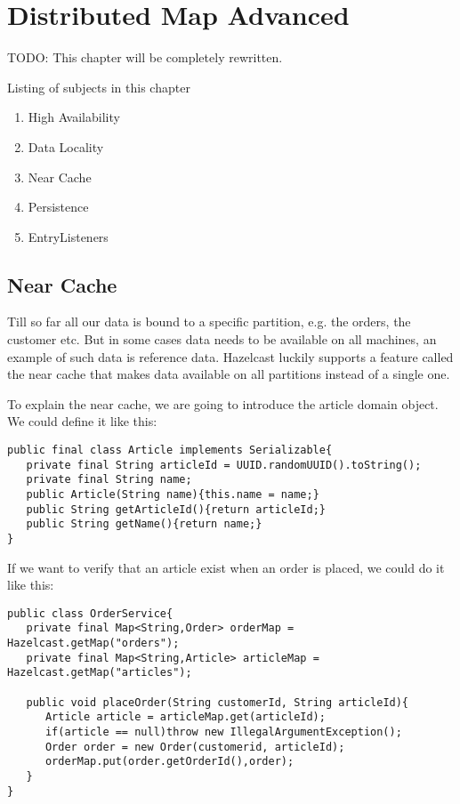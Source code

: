 \chapter{Distributed Map Advanced}

TODO: This chapter will be completely rewritten.

Listing of subjects in this chapter
\begin{enumerate}
\item High Availability
\item Data Locality
\item Near Cache
\item Persistence
\item EntryListeners
\end{enumerate}



\section{Near Cache}

Till so far all our data is bound to a specific partition, e.g. the orders, the customer etc. But in some cases  data needs to be available on all machines, an example of such data is reference data. Hazelcast luckily supports  a feature called the near cache that makes data available on all partitions instead of a single one.

To explain the near cache, we are going to introduce the article domain object. We could define it like this:

\begin{verbatim}
public final class Article implements Serializable{
   private final String articleId = UUID.randomUUID().toString();
   private final String name;
   public Article(String name){this.name = name;}
   public String getArticleId(){return articleId;}
   public String getName(){return name;}
}
\end{verbatim}

If we want to verify that an article exist when an order is placed, we could do it like this:

\begin{verbatim}
public class OrderService{
   private final Map<String,Order> orderMap = Hazelcast.getMap("orders");
   private final Map<String,Article> articleMap = Hazelcast.getMap("articles");

   public void placeOrder(String customerId, String articleId){
      Article article = articleMap.get(articleId);
      if(article == null)throw new IllegalArgumentException();
      Order order = new Order(customerid, articleId);
      orderMap.put(order.getOrderId(),order);
   }
}
\end{verbatim}

